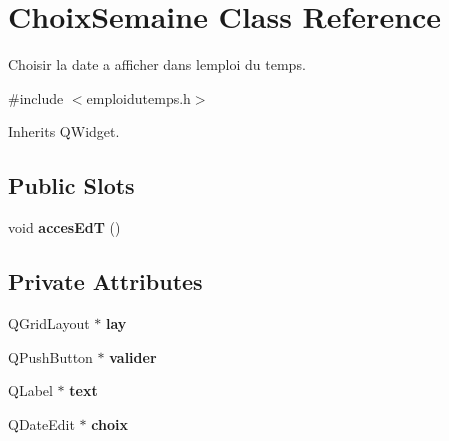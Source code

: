 \hypertarget{class_choix_semaine}{}\section{Choix\+Semaine Class Reference}
\label{class_choix_semaine}


Choisir la date a afficher dans l\textquotesingle{}emploi du temps.  




{\ttfamily \#include $<$emploidutemps.\+h$>$}



Inherits Q\+Widget.

\subsection*{Public Slots}
\begin{DoxyCompactItemize}
\item 
\hypertarget{class_choix_semaine_aac734d4f6da687961492011f0ead1545}{}void {\bfseries acces\+Ed\+T} ()\label{class_choix_semaine_aac734d4f6da687961492011f0ead1545}

\end{DoxyCompactItemize}
\subsection*{Private Attributes}
\begin{DoxyCompactItemize}
\item 
\hypertarget{class_choix_semaine_a48e322eca1f21a82c0878b4eaea50d7e}{}Q\+Grid\+Layout $\ast$ {\bfseries lay}\label{class_choix_semaine_a48e322eca1f21a82c0878b4eaea50d7e}

\item 
\hypertarget{class_choix_semaine_a739de96c87c9b4dbf4feca009902baf2}{}Q\+Push\+Button $\ast$ {\bfseries valider}\label{class_choix_semaine_a739de96c87c9b4dbf4feca009902baf2}

\item 
\hypertarget{class_choix_semaine_acdf10729c2f640ff1d93910e0cba934f}{}Q\+Label $\ast$ {\bfseries text}\label{class_choix_semaine_acdf10729c2f640ff1d93910e0cba934f}

\item 
\hypertarget{class_choix_semaine_ac925769c0a7319aad3d7f7b8fb77d71f}{}Q\+Date\+Edit $\ast$ {\bfseries choix}\label{class_choix_semaine_ac925769c0a7319aad3d7f7b8fb77d71f}

\end{DoxyCompactItemize}


